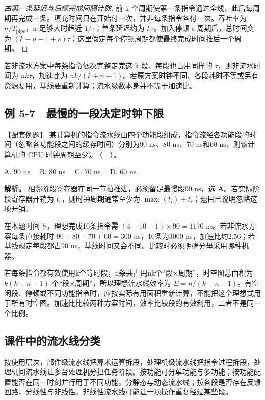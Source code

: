 \begin{proof}[由第一条延迟与后续完成间隔计数]

前 k 个周期使第一条指令通过全线，此后每周期再完成一条。填充时间只在开始付一次，并非每条指令各付一次。吞吐率为 \(n/T_{\mathrm{pipe}}\)，n 足够大时趋近 \(1/\tau\)；单条延迟约为 \(k\tau\)。加入停顿 s 周期后，总时间变为 \((k+n-1+s)\tau\)；这里假定每个停顿周期都使最终完成时间推后一个周期。

\end{proof}

若非流水方案中每条指令依次完整走完这 k 段、每段也占用同样的 \(\tau\)，则非流水时间为 \(nk\tau\)，加速比为 \(nk/(k+n-1)\)。若原方案时钟不同、各段耗时不等或另有资源复用，基线要重新计算；流水级数本身并不等于加速比。

\subsection{例 5-7　最慢的一段决定时钟下限}\label{CO05-example-7}

【配套例题】 某计算机的指令流水线由四个功能段组成，指令流经各功能段的时间（忽略各功能段之间的缓存时间）分别为90 ns、80 ns、70 ns和60 ns，则该计算机的 CPU 时钟周期至少是（　）。

A. 90 ns　 B. 80 ns　 C. 70 ns　 D. 60 ns

\textbf{解析。} 相邻阶段寄存器在同一节拍推进，必须留足最慢段90 ns，选 \textbf{A}。若实际阶段寄存器开销为 \(t_r\)，则时钟周期通常至少为 \(\max_i(t_i)+t_r\)；题目已说明忽略这项开销。

在本题时间下，理想完成10条指令需 \((4+10-1)\times90=1170\) ns。若非流水方案每条直接耗时 \(90+80+70+60=300\) ns，10条为3000 ns，加速比约2.56；若基线规定每段都占90 ns，基线时间又会不同。比较时必须明确分母采用哪种机器。

若每条指令都有效使用k个等时段，n条共占用nk个“段\ensuremath{\times}周期”，时空图总面积为 \(k(k+n-1)\) 个“段\ensuremath{\times}周期”，所以理想流水线效率为 \(E=n/(k+n-1)\)。有空闲段、停顿或不同功能指令时，应按实际有用面积重新计算，不能把这个理想式用于所有时空图。加速比比较两种方案时间，效率比较段的有效利用，二者不是同一个比例。

\subsection{课件中的流水线分类}\label{CO05-pipeline-types}

按使用层次，部件级流水线把算术运算拆段，处理机级流水线把指令过程拆段，处理机间流水线让多台处理机分担任务阶段。按功能可分单功能与多功能；按功能配置能否在同一时刻并行用于不同功能，分静态与动态流水线；按各段是否存在反馈回路，分线性与非线性。非线性流水线可能让一项操作重复经过某些段。

